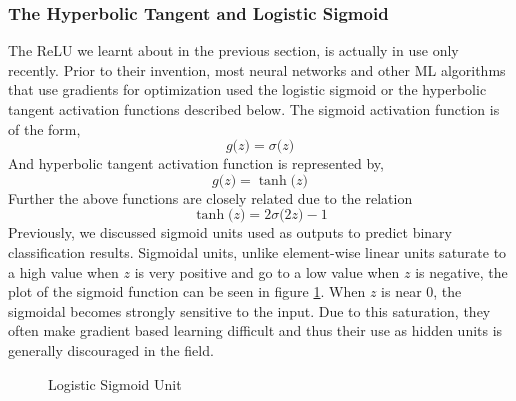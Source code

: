 \documentclass[14pt]{extarticle}
\numberwithin{equation}{section}
\begin{document}
	\subsubsection{The Hyperbolic Tangent and Logistic Sigmoid}
	The ReLU we learnt about in the previous section, is actually in use only recently. Prior to their invention, most neural networks and other ML algorithms that use gradients for optimization used the logistic sigmoid or the hyperbolic tangent activation functions described below.
	The sigmoid activation function is of the form,
	\begin{equation}
	g\big(z\big) = \sigma\big(z\big)
	\end{equation}
	And hyperbolic tangent activation function is represented by,
	\begin{equation}
	g\big(z\big) = \tanh\big(z\big)
	\end{equation}
	Further the above functions are closely related due to the relation $$\tanh\big(z\big) = 2\sigma\big(2z\big) - 1$$
	Previously, we discussed sigmoid units used as outputs to predict binary classification results. Sigmoidal units, unlike element-wise linear units saturate to a high value when $z$ is very positive and go to a low value when $z$ is negative, the plot of the sigmoid function can be seen in figure \ref{sigmoid}. When $z$ is near 0, the sigmoidal becomes strongly sensitive to the input. Due to this saturation, they often make gradient based learning difficult and thus their use as hidden units is generally discouraged in the field.
	\begin{figure}[H]
		\centering
		\setlength{\fboxsep}{5pt}%
		\setlength{\fboxrule}{1pt}%
		\caption{Logistic Sigmoid Unit
			\label{sigmoid}}
	\end{figure}
\end{document}

